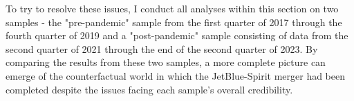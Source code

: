\documentclass{article}
\begin{document}
 	To try to resolve these issues, I conduct all analyses within this section on two samples - the "pre-pandemic" sample from the first quarter of 2017 through the fourth quarter of  2019 and a "post-pandemic" sample consisting of data from the second quarter of 2021 through the end of the second quarter of 2023. By comparing the results from these two samples, a more complete picture can emerge of the counterfactual world in which the JetBlue-Spirit merger had been completed despite the issues facing each sample's overall credibility.  
 	 	 
 	 
 	 
\end{document}
